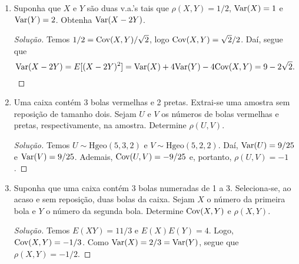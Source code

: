 \documentclass[../Notas.tex]{subfiles}
\begin{document}
\begin{enumerate}
    \begin{proof}[Solução]
        Temos
        \[
        \Cov(X_1 - X_2, X_2 + X_3) = E[(X_1 - X_2 - E(X_1 - X_2))(X_2 + X_3 - E(X_2 + X_3))]
                                   = -\sigma_2^2
        \]
        após várias simplificações. Daí, como $\Var(X_1 - X_2) = \sigma_1^2 + \sigma_2^2$ e
        $\Var(X_2 + X_3) = \sigma_2^2 + \sigma_3^2$, obtemos
        \[
        \rho(X_1 - X_2, X_2 + X_3) 
        = -\frac{\sigma_2^2}{\sqrt{(\sigma_1^2 + \sigma_2^2)(\sigma_2^2 + \sigma_3^2)}}.
        \]
    \end{proof}
    \item Suponha que $X$ e $Y$ são duas v.a.’s tais que $\rho(X,Y) = 1/2$, $\text{Var}(X) = 1$ e $\text{Var}(Y) = 2$. Obtenha $\text{Var}(X - 2Y)$.
    \begin{proof}[Solução]
        Temos $1/2 = \text{Cov}(X,Y)/\sqrt{2}$, logo $\text{Cov}(X,Y) = \sqrt{2}/2$. Daí, segue que
        \[
        \text{Var}(X - 2Y) = E[(X-2Y)^2] = \text{Var}(X) + 4\text{Var}(Y) - 4\text{Cov}(X,Y) = 9-2\sqrt{2}.
        \]
    \end{proof}
    \item Uma caixa contém 3 bolas vermelhas e 2 pretas. Extrai-se uma amostra sem reposição de tamanho dois. Sejam $U$ e $V$ os números de bolas vermelhas e pretas, respectivamente, na amostra. Determine $\rho(U, V)$.
    \begin{proof}[Solução]
        Temos $U\sim\text{Hgeo}(5,3,2)$ e $V\sim\text{Hgeo}(5,2,2)$. Daí, $\text{Var}(U) = 9/25$ e
        $\text{Var}(V) = 9/25$. Ademais, $\text{Cov}(U,V) = -9/25$ e, portanto, $\rho(U,V) = -1$.
    \end{proof}
    \item Suponha que uma caixa contém 3 bolas numeradas de 1 a 3. Seleciona-se, ao acaso e sem reposição, duas bolas da caixa. Sejam $X$ o número da primeira bola e $Y$ o número da segunda bola. Determine $\text{Cov}(X, Y)$ e $\rho(X, Y)$.
    \begin{proof}[Solução]
        Temos $E(XY) = 11/3$ e $E(X)E(Y) = 4$. Logo, $\text{Cov}(X,Y) = -1/3$. Como $\text{Var}(X) = 2/3 = \text{Var}(Y)$,
        segue que $\rho(X,Y) = -1/2$.
    \end{proof}
\end{enumerate}
\end{document}
